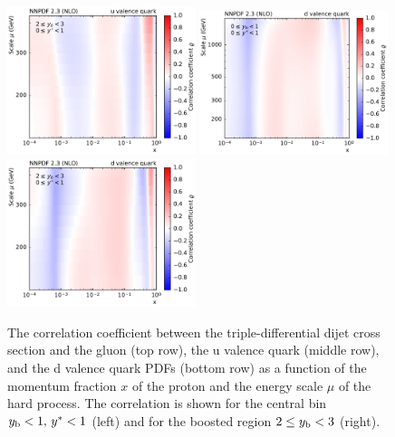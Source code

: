 \begin{figure}[p]
  \includegraphics[width=0.49\textwidth]{figures/pdf_constraints/corr_PTMAXEXPYS_YBYS_NLO_FINALBINS_NNPDF23_u_valence_quark_ys0_0yb2_0_cl.pdf}
  \includegraphics[width=0.49\textwidth]{figures/pdf_constraints/corr_PTMAXEXPYS_YBYS_NLO_FINALBINS_NNPDF23_d_valence_quark_ys0_0yb0_0_cl.pdf}\hfill%
  \includegraphics[width=0.49\textwidth]{figures/pdf_constraints/corr_PTMAXEXPYS_YBYS_NLO_FINALBINS_NNPDF23_d_valence_quark_ys0_0yb2_0_cl.pdf}
  \caption[Correlation between dijet cross section and PDFs]{
    The correlation coefficient between the triple-differential dijet cross
    section and the gluon (top row), the u valence quark (middle row),
    and the d valence quark PDFs (bottom row) as a function of the
    momentum fraction $x$ of the proton and the energy scale $\mu$ of
    the hard process. The correlation is shown for the central
    bin $y_{\mathrm{b}} < 1,\,y^{*} < 1$ (left) and for the boosted region $2 \leq
    y_{\mathrm{b}} < 3$ (right).}
  \label{fig:correlation_pdf_xs_gqq}
\end{figure}

